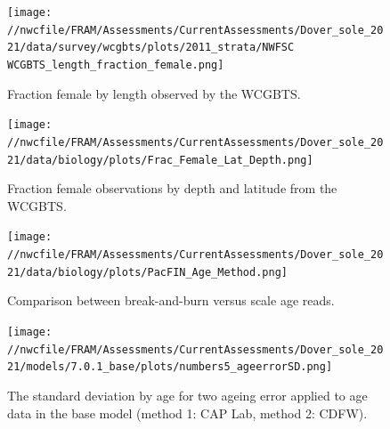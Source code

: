 \documentclass[11pt,
  english,
  a4paper,
]{article}
\begin{document}
\begin{figure}
\centering
\texttt{[image: //nwcfile/FRAM/Assessments/CurrentAssessments/Dover\_sole\_2021/data/survey/wcgbts/plots/2011\_strata/NWFSC WCGBTS\_length\_fraction\_female.png]}
\caption{Fraction female by length observed by the WCGBTS.\label{fig:sex-by-len}}
\end{figure}

\tagmcend\tagstructend


\begin{figure}
\centering
\texttt{[image: //nwcfile/FRAM/Assessments/CurrentAssessments/Dover\_sole\_2021/data/biology/plots/Frac\_Female\_Lat\_Depth.png]}
\caption{Fraction female observations by depth and latitude from the WCGBTS.\label{fig:fem-by-lat-depth}}
\end{figure}

\tagmcend\tagstructend


\begin{figure}
\centering
\texttt{[image: //nwcfile/FRAM/Assessments/CurrentAssessments/Dover\_sole\_2021/data/biology/plots/PacFIN\_Age\_Method.png]}
\caption{Comparison between break-and-burn versus scale age reads.\label{fig:scale-age}}
\end{figure}

\tagmcend\tagstructend


\begin{figure}
\centering
\texttt{[image: //nwcfile/FRAM/Assessments/CurrentAssessments/Dover\_sole\_2021/models/7.0.1\_base/plots/numbers5\_ageerrorSD.png]}
\caption{The standard deviation by age for two ageing error applied to age data in the base model (method 1: CAP Lab, method 2: CDFW).\label{fig:age-error}}
\end{figure}

\tagmcend\tagstructend

\end{document}
